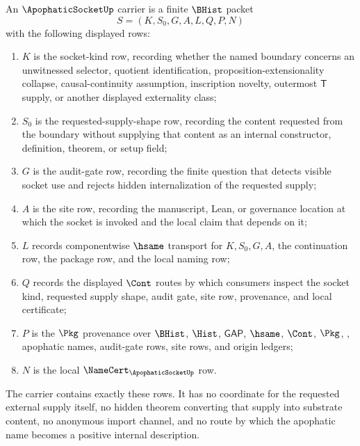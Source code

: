 \begin{definition}
\label{def:apophatic-socket-ledger-carrier}
An $\ApophaticSocketUp$ carrier is a finite $\BHist$ packet
$$
S=(K,S_0,G,A,L,Q,P,N)
$$
with the following displayed rows:
\begin{enumerate}
\item $K$ is the socket-kind row, recording whether the named boundary concerns an unwitnessed selector, quotient identification, proposition-extensionality collapse, causal-continuity assumption, inscription novelty, outermost $\mathsf{T}$ supply, or another displayed externality class;
\item $S_0$ is the requested-supply-shape row, recording the content requested from the boundary without supplying that content as an internal constructor, definition, theorem, or setup field;
\item $G$ is the audit-gate row, recording the finite question that detects visible socket use and rejects hidden internalization of the requested supply;
\item $A$ is the site row, recording the manuscript, Lean, or governance location at which the socket is invoked and the local claim that depends on it;
\item $L$ records componentwise $\hsame$ transport for $K,S_0,G,A$, the continuation row, the package row, and the local naming row;
\item $Q$ records the displayed $\Cont$ routes by which consumers inspect the socket kind, requested supply shape, audit gate, site row, provenance, and local certificate;
\item $P$ is the $\Pkg$ provenance over $\BHist$, $\Hist$, $\mathsf{GAP}$, $\hsame$, $\Cont$, $\Pkg$, \NameCert{}, apophatic names, audit-gate rows, site rows, and origin ledgers;
\item $N$ is the local $\NameCert_{\ApophaticSocketUp}$ row.
\end{enumerate}
The carrier contains exactly these rows. It has no coordinate for the requested external supply itself, no hidden theorem converting that supply into substrate content, no anonymous import channel, and no route by which the apophatic name becomes a positive internal description.
\end{definition}

